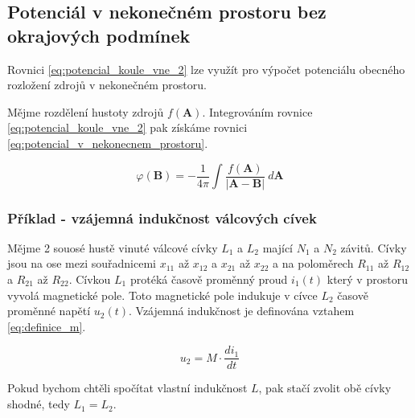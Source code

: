 \documentclass{book}
\newcommand{\vect}[1]{\boldsymbol{#1}}
\begin{document}
\subsection{Potenciál v nekonečném prostoru bez okrajových podmínek}

Rovnici \eqref{eq:potencial_koule_vne_2} lze využít pro výpočet potenciálu obecného rozložení zdrojů v nekonečném prostoru.

Mějme rozdělení hustoty zdrojů \(f(\vect{A})\). Integrováním rovnice \eqref{eq:potencial_koule_vne_2} pak získáme rovnici \eqref{eq:potencial_v_nekonecnem_prostoru}.

\begin{equation}
\label{eq:potencial_v_nekonecnem_prostoru}
\varphi(\vect{B}) = -\frac{1}{4 \pi} \int \frac{f(\vect{A})}{|\vect{A} - \vect{B}|} \ d\vect{A}
\end{equation}

\subsubsection{Příklad - vzájemná indukčnost válcových cívek}

Mějme 2 souosé hustě vinuté válcové cívky \(L_1\) a \(L_2\) mající \(N_1\) a \(N_2\) závitů. Cívky jsou na ose mezi souřadnicemi \(x_{11}\) až \(x_{12}\) a \(x_{21}\) až \(x_{22}\) a na poloměrech \(R_{11}\) až \(R_{12}\) a \(R_{21}\) až \(R_{22}\). Cívkou \(L_1\) protéká časově proměnný proud \(i_1(t)\) který v prostoru vyvolá magnetické pole. Toto magnetické pole indukuje v cívce \(L_2\) časově proměnné napětí \(u_2(t)\). Vzájemná indukčnost je definována vztahem \eqref{eq:definice_m}.

\begin{equation}
\label{eq:definice_m}
u_2 = M \cdot \frac{di_1}{dt}
\end{equation}

Pokud bychom chtěli spočítat vlastní indukčnost \(L\), pak stačí zvolit obě cívky shodné, tedy \(L_1 = L_2\).


\end{document}
